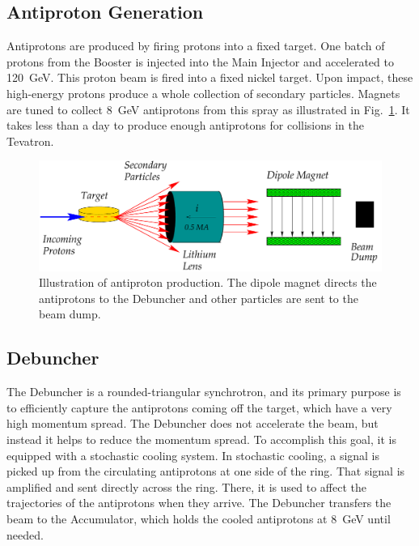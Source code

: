 \subsection{Antiproton Generation}
Antiprotons are produced by firing protons into a fixed target. One batch of protons from the Booster is injected into the Main Injector and accelerated to \mbox{120 GeV}. This proton beam is fired into a fixed nickel target. Upon impact, these high-energy protons produce a whole collection of secondary particles. Magnets are tuned to collect 8~GeV antiprotons from this spray as illustrated in Fig.~\ref{fig:AntiProtonProduction}. It takes less than a day to produce enough antiprotons for collisions in the Tevatron.

\begin{figure}[htbm]
 \centering
 \includegraphics[scale=0.7,keepaspectratio=true,angle=0]{./Antiproton_production.pdf}
 \caption{Illustration of antiproton production. The dipole magnet directs the antiprotons to the Debuncher and other particles are sent to the beam dump.}
 \label{fig:AntiProtonProduction}
\end{figure}
\vspace{-0.03\textheight}

\subsection{Debuncher}
The Debuncher is a rounded-triangular synchrotron, and its primary purpose is to efficiently capture the antiprotons coming off the target, which have a very high momentum spread. The Debuncher does not accelerate the beam, but instead it helps to reduce the momentum spread. To accomplish this goal, it is equipped with a stochastic cooling system. In stochastic cooling, a signal is picked up from the circulating antiprotons at one side of the ring. That signal is amplified and sent directly across the ring. There, it is used to affect the trajectories of the antiprotons when they arrive. The Debuncher transfers the beam to the Accumulator, which holds the cooled antiprotons at 8~GeV until needed.

